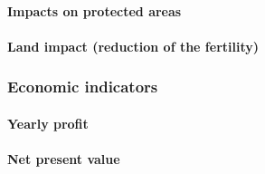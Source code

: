 \documentclass[10pt,a4paper]{article}
\begin{document}
\paragraph{Impacts on protected areas}

\paragraph{Land impact (reduction of the fertility)}

\subsubsection{Economic indicators}
\paragraph{Yearly profit}
\paragraph{Net present value}

\end{document}
